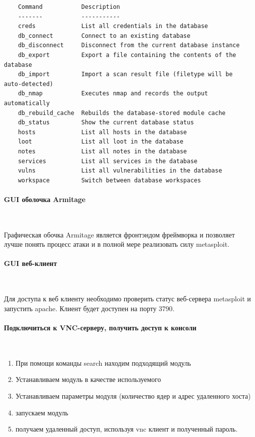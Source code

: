\documentclass{article}
\begin{document}
\begin{verbatim}
    Command           Description
    -------           -----------
    creds             List all credentials in the database
    db_connect        Connect to an existing database
    db_disconnect     Disconnect from the current database instance
    db_export         Export a file containing the contents of the database
    db_import         Import a scan result file (filetype will be auto-detected)
    db_nmap           Executes nmap and records the output automatically
    db_rebuild_cache  Rebuilds the database-stored module cache
    db_status         Show the current database status
    hosts             List all hosts in the database
    loot              List all loot in the database
    notes             List all notes in the database
    services          List all services in the database
    vulns             List all vulnerabilities in the database
    workspace         Switch between database workspaces

\end{verbatim}

\paragraph{GUI оболочка Armitage}
~

Графическая обочка Armitage является фронтэндом фреймворка и позволяет лучше понять процесс атаки и в полной мере реализовать силу metasploit.

\paragraph{GUI веб-клиент}
~

Для доступа к веб клиенту необходимо проверить статус веб-сервера metasploit и запустить apache. Клиент будет доступен на порту 3790.


\paragraph{Подключиться к VNC-серверу, получить доступ к консоли}
~

\begin{enumerate}
\item При помощи команды search находим подходящий модуль
\item Устанавливаем модуль в качестве используемого
\item Устанавливаем параметры модуля (количество ядер и адрес удаленного хоста)
\item запускаем модуль
\item получаем удаленный доступ, используя vnc клиент и полученный пароль.
\end{enumerate}
\end{document}
